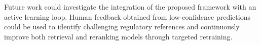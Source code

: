 Future work could investigate the integration of the proposed framework with an active learning loop. Human feedback obtained from low-confidence predictions could be used to identify challenging regulatory references and continuously improve both retrieval and reranking models through targeted retraining.